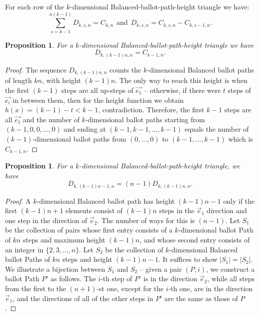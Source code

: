 \documentclass[12pt,notitlepage]{amsart}
\numberwithin{equation}{section}
\theoremstyle{thmstyleone}%
\newtheorem{proposition}[theorem]{Proposition}%
\theoremstyle{thmstyletwo}%
\theoremstyle{thmstylethree}%
\numberwithin{theorem}{section}
\numberwithin{equation}{section}
\begin{document}
For each row of the $k$-dimensional Balanced-ballot-path-height triangle we have: 
$$\sum_{s=k-1}^{n(k-1)} D_{k,s,n} = C_{k,n} \ \ \text{and} \ \ D_{k,s,n} = C_{k,s,n} - C_{k,s-1,n}.$$
\begin{proposition}
\label{proposition:dyckheight-catalan}
For a $k$-dimensional Balanced-ballot-path-height triangle we have
\[D_{k,(k-1)n,n} = C_{k-1,n}.\]
\end{proposition}
\begin{proof}
   The sequence $D_{k,(k-1)n,n}$ counts the $k$-dimensional Balanced ballot paths of length $kn$, with height $(k-1)n$. The only way to reach this height is when the first $(k-1)$ steps are all up-steps of $\vec{e_1}$ -- otherwise, if there were $t$ steps of $\vec{e_i}$ in between them, then for the height function we obtain $h(x) = (k-1) - t < k-1$, contradiction. Therefore, the first $k-1$ steps are all $\vec{e_1}$ and the number of $k$-dimensional ballot paths starting from $(k-1,0,0,\ldots,0)$ and ending at $(k-1,k-1,\ldots,k-1)$ equals the number of $(k-1)$-dimensional ballot paths from $(0,\ldots,0)$ to $(k-1,\ldots, k-1)$ which is $C_{k-1,n}$.
\end{proof}

\begin{proposition}
    For a $k$-dimensional Balanced-ballot-path-height triangle, we have
    \[D_{k,(k-1)n-1,n} = (n-1)D_{k,(k-1)n,n}.\]
\end{proposition}
\begin{proof}
    A $k$-dimensional Balanced ballot path has height $(k-1)n-1$ only if the first $(k-1)n+1$ elements consist of $(k-1)n$ steps in the $\vec{e}_1$ direction and one step in the direction of $\vec{e}_2$. The number of ways for this is $(n-1)$. Let $S_1$ be the collection of pairs whose first entry consists of a $k$-dimensional ballot Path of $kn$ steps and maximum height $(k-1)n$, and whose second entry consists of an integer in $\{2,3,\ldots,n\}$. Let $S_2$ be the collection of $k$-dimensional Balanced ballot Paths of $kn$ steps and height $(k-1)n-1$. It suffices to show $|S_1| = |S_2|$. We illustrate a bijection between $S_1$ and $S_2$ -- given a pair $(P, i)$, we construct a ballot Path $P'$ as follows. The $i$-th step of $P'$ is in the direction $\vec{e}_2$, while all steps from the first to the $(n+1)$-st one, except for the $i$-th one, are in the direction $\vec{e}_1$, and the directions of all of the other steps in $P'$ are the same as those of $P$.
\end{proof}
\end{document}
